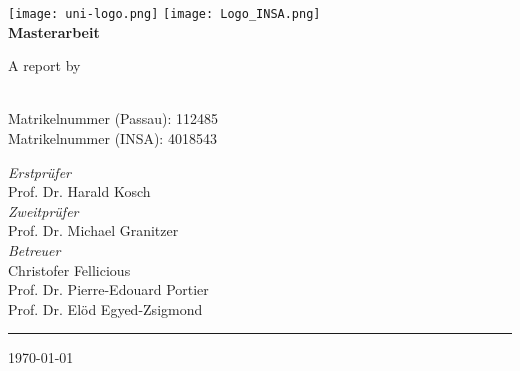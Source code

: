 \begin{titlepage}
    \centering
    \begin{onehalfspace}
    	
        	\texttt{[image: uni-logo.png]}
			\hspace*{1.0cm}
			\texttt{[image: Logo\_INSA.png]}\\
        	\vspace{1.0cm}
        	{\Large \bfseries Masterarbeit}\\

        	\vspace{2.5cm}

            \begin{doublespace}
            	{\textsf{\Huge{\thetitle}}}
            \end{doublespace}

        	\vspace{2cm}

            {\Large A report by}\\

        	\vspace{1cm}

        	{\bfseries \large{\theauthor}} \\
			\vspace{0.5cm}
			Matrikelnummer (Passau): 112485 \\
			Matrikelnummer (INSA): 4018543 \\


        	\vfill

        	{\Large
                \textit{Erstpr\"ufer} \\
				Prof. Dr. Harald Kosch \\
				\textit{Zweitpr\"ufer} \\
				Prof. Dr. Michael Granitzer\\
				\vspace{0.5cm}
				\textit{Betreuer} \\
				Christofer Fellicious\\
				Prof. Dr. Pierre-Edouard Portier\\
				Prof. Dr. Elöd Egyed-Zsigmond\\
        	}

        	\vspace{1cm}

        	\parbox{\linewidth}{\hrule\strut}

            \vfill

			{\large \today}
    \end{onehalfspace}
\end{titlepage}

